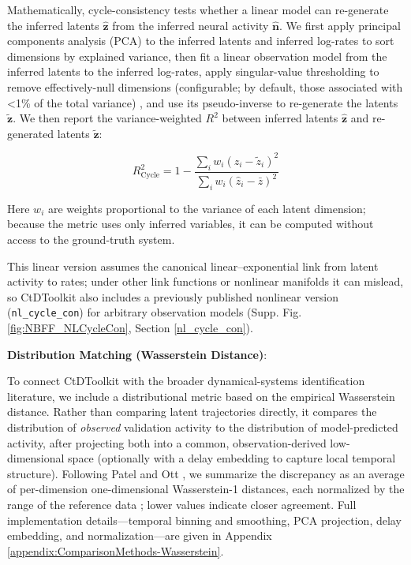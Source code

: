 \documentclass{article}
\begin{document}
Mathematically, cycle-consistency tests whether a linear model can re-generate the inferred latents $\hat{\mathbf{z}}$ from the inferred neural activity $\hat{\mathbf{n}}$. We first apply principal components analysis (PCA) to the inferred latents and inferred log-rates to sort dimensions by explained variance, then fit a linear observation model from the inferred latents to the inferred log-rates, apply singular-value thresholding to remove effectively-null dimensions (configurable; by default, those associated with <1\% of the total variance) \cite{roy2007effective}, and use its pseudo-inverse to re-generate the latents $\tilde{\mathbf{z}}$. We then report the variance-weighted \( R^2 \) between inferred latents \( \mathbf{\hat{z}} \) and re-generated latents \( \tilde{\mathbf{z}} \):

\[
R^2_{\text{Cycle}} = 1 - \frac{\sum_{i} w_i (\hat{z}_i - \tilde{z}_i)^2}{\sum_{i} w_i (\hat{z}_i - \bar{z})^2}
\]

Here $w_i$ are weights proportional to the variance of each latent dimension; because the metric uses only inferred variables, it can be computed without access to the ground-truth system.

This linear version assumes the canonical linear--exponential link from latent activity to rates; under other link functions or nonlinear manifolds it can mislead, so CtDToolkit also includes a previously published nonlinear version (\texttt{nl\_cycle\_con}) for arbitrary observation models \cite{versteeg2023expressive} (Supp. Fig. \ref{fig:NBFF_NLCycleCon}, Section \ref{nl_cycle_con}).


\textbf{Distribution Matching (Wasserstein Distance)}:

To connect CtDToolkit with the broader dynamical-systems identification literature, we include a distributional metric based on the empirical Wasserstein distance. Rather than comparing latent trajectories directly, it compares the distribution of \emph{observed} validation activity to the distribution of model-predicted activity, after projecting both into a common, observation-derived low-dimensional space (optionally with a delay embedding to capture local temporal structure). Following Patel and Ott \cite{patel2023using}, we summarize the discrepancy as an average of per-dimension one-dimensional Wasserstein-1 distances, each normalized by the range of the reference data \cite{durstewitz2023reconstructing}; lower values indicate closer agreement. Full implementation details---temporal binning and smoothing, PCA projection, delay embedding, and normalization---are given in Appendix \ref{appendix:ComparisonMethods-Wasserstein}.
\end{document}
